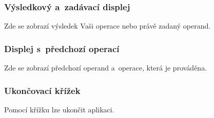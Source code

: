 \documentclass[a5paper,8pt,twoside]{extarticle}
\begin{document}
    \subsubsection{Výsledkový a~zadávací displej}
    Zde se zobrazí výsledek Vaši operace nebo právě zadaný operand.

    \subsubsection{Displej s~předchozí operací}
    Zde se zobrazí předchozí operand a~operace, která je prováděna.

    \subsubsection{Ukončovací křížek}
    Pomocí křížku lze ukončit aplikaci.
\end{document}
